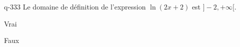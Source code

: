 \begin{truefalse}{q-333}
Le domaine de définition de l'expression $\ln(2x+2)$ est $]-2,+\infty[$.
\item Vrai
\item* Faux
\end{truefalse}

